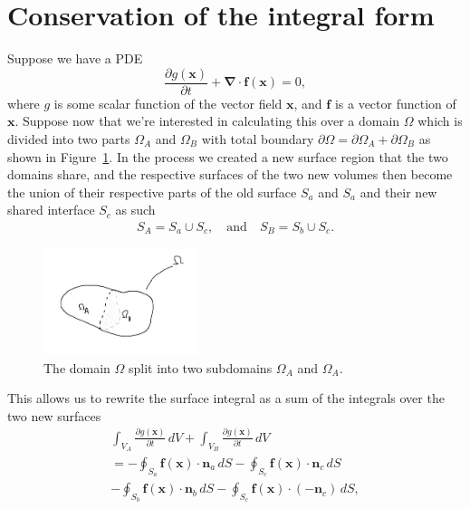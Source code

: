 \documentclass[acmtog]{acmart}
\begin{document}
\section{Conservation of the integral form}
Suppose we have a PDE
%
\begin{equation}
  \frac{\partial g(\boldsymbol x)}{\partial t} + \boldsymbol \nabla \cdot \boldsymbol f (\boldsymbol x) = 0, \label{eq:pde}
\end{equation}
%
where $g$ is some scalar function of the vector field $\boldsymbol x$, and $\boldsymbol f$ is a vector function of $\boldsymbol x$.
Suppose now that we're interested in calculating this over a domain $\Omega$ which is divided into two parts $\Omega_A$ and $\Omega_B$ with total boundary $\partial \Omega = \partial \Omega_A + \partial \Omega_B$ as shown in Figure\ \ref{fig:vol2}. In the process we created a new surface region that the two domains share, and the respective surfaces of the two new volumes then become the union of their respective parts of the old surface $S_a$ and $S_a$ and their new shared interface $S_c$ as such
%
\begin{align}
  S_A = S_a \cup S_c, \quad \text{and} \quad S_B = S_b \cup S_c.
\end{align}
%
\begin{figure}
  \centering
  \includegraphics[width=0.4\textwidth]{Images/volume2.png}
  \caption[Toy domain split]{The domain $\Omega$ split into two subdomains $\Omega_A$ and $\Omega_A$.\label{fig:vol2}}
\end{figure}
%
This allows us to rewrite the surface integral as a sum of the integrals over the two new surfaces
\begin{multline}
  \int_{V_A} \frac{\partial g(\boldsymbol x)}{\partial t} \, dV + \int_{V_B} \frac{\partial g(\boldsymbol x)}{\partial t} \, dV\\
  = - \oint_{S_a} \boldsymbol f (\boldsymbol x) \cdot \boldsymbol n_a \, dS - \oint_{S_c} \boldsymbol f (\boldsymbol x) \cdot \boldsymbol n_c \, dS\\
  - \oint_{S_b} \boldsymbol f (\boldsymbol x) \cdot \boldsymbol n_b \, dS - \oint_{S_c} \boldsymbol f (\boldsymbol x) \cdot (- \boldsymbol n_c) \, dS,
\end{multline}
\end{document}

